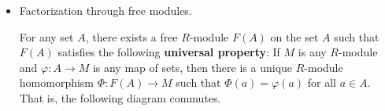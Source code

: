 \documentclass[../notes.tex]{subfiles}
\begin{document}
\begin{itemize}
\begin{itemize}
    \end{itemize}
    \item Factorization through free modules.
    \begin{theorem}\label{trm:10.6}
        For any set $A$, there exists a free $R$-module $F(A)$ on the set $A$ such that $F(A)$ satisfies the following \textbf{universal property}: If $M$ is any $R$-module and $\varphi:A\to M$ is any map of sets, then there is a unique $R$-module homomorphism $\Phi:F(A)\to M$ such that $\Phi(a)=\varphi(a)$ for all $a\in A$. That is, the following diagram commutes.
        \begin{figure}[H]
            \centering
\end{figure}
\end{theorem}
\end{itemize}
\end{document}
